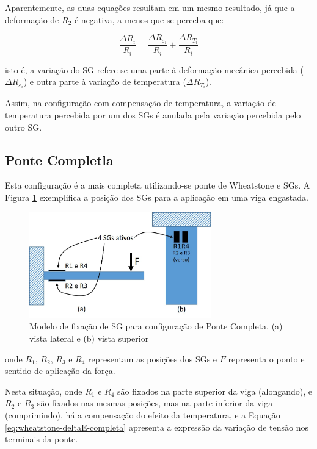 \documentclass[a4paper]{instrumentacao}
\begin{document}
Aparentemente, as duas equações resultam em um mesmo resultado, já que a deformação de $R_2$ é negativa, a menos que se perceba que:

\begin{equation}
	\frac{\Delta R_i}{R_i}=\frac{\Delta R_{\varepsilon_i}}{R_i}+\frac{\Delta R_{T_i}}{R_i}
	\label{eq:compensacao-temp}
\end{equation}

\noindent isto é, a variação do SG refere-se uma parte à deformação mecânica percebida ($\Delta R_{\varepsilon_i}$) e outra parte à variação de temperatura ($\Delta R_{T_i}$).

Assim, na configuração com compensação de temperatura, a variação de temperatura percebida por um dos SGs é anulada pela variação percebida pelo outro SG.

\subsection{Ponte Completla}

Esta configuração é a mais completa utilizando-se ponte de Wheatstone e SGs. A Figura \ref{fig:ponte-completa} exemplifica a posição dos SGs para a aplicação em uma viga engastada.

\begin{figure}[H]
\center
\includegraphics[width=0.7\textwidth]{ponte completa.jpg}
\caption{Modelo de fixação de SG para configuração de Ponte Completa. (a) vista lateral e (b) vista superior}
\label{fig:ponte-completa}
\end{figure}

\noindent onde $R_1$, $R_2$, $R_3$ e $R_4$ representam as posições dos SGs e $F$ representa o ponto e sentido de aplicação da força.

Nesta situação, onde $R_1$ e $R_4$ são fixados na parte superior da viga (alongando), e $R_2$ e $R_3$ são fixados nas mesmas posições, mas na parte inferior da viga (comprimindo), há a compensação do efeito da temperatura, e a Equação \ref{eq:wheatstone-deltaE-completa} apresenta a expressão da variação de tensão nos terminais da ponte.
\end{document}
